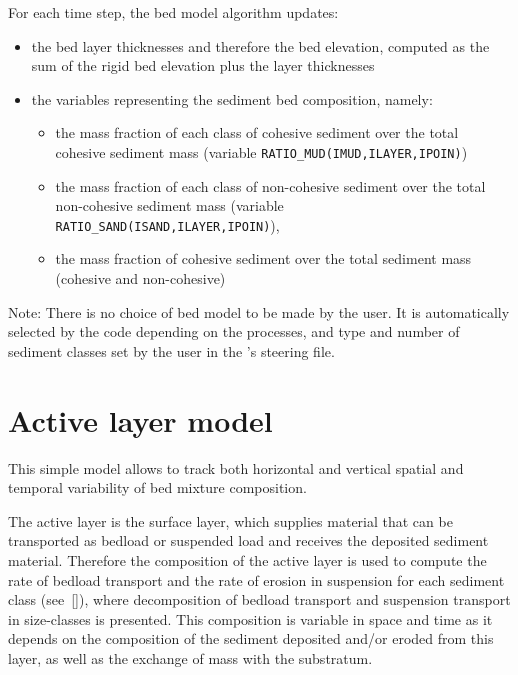 For each time step, the bed model algorithm updates:
\begin{itemize}
\item the bed layer thicknesses and therefore the bed elevation, computed as the sum of the rigid bed elevation plus the layer thicknesses
\item the variables representing the sediment bed composition, namely:
  \begin{itemize}
  \item the mass fraction of each class of cohesive sediment over the total cohesive sediment mass (variable \texttt{RATIO\_MUD(IMUD,ILAYER,IPOIN)})
  \item the mass fraction of each class of non-cohesive sediment over the total non-cohesive sediment mass (variable \texttt{RATIO\_SAND(ISAND,ILAYER,IPOIN)}), 
  \item the mass fraction of cohesive sediment over the total sediment mass (cohesive and non-cohesive)
  \end{itemize}
\end{itemize}

\begin{WarningBlock}{Note:}
There is no choice of bed model to be made by the user. It is automatically selected by the code depending on the processes, and type and number of sediment classes set by the user in the \gaia{}'s steering file.  
\end{WarningBlock}

\section{Active layer model}\label{bedmodel:active}
This simple model allows to track both horizontal and vertical spatial and temporal variability of bed mixture composition.

The active layer is the surface layer, which supplies material that can be transported as bedload or suspended load and receives the deposited sediment material. Therefore the composition of the active layer is used to compute the rate of bedload transport and the rate of erosion in suspension for each sediment class (see~\ref{}), where decomposition of bedload transport and suspension transport in size-classes is presented. This composition is variable in space and time as it depends on the composition of the sediment deposited and/or eroded from this layer, as well as the exchange of mass with the substratum.


